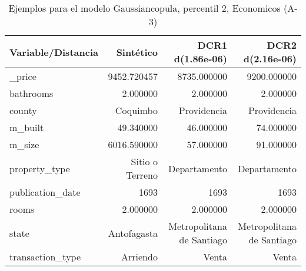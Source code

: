 \begin{table}[H]
\centering
\fontsize{10}{14}\selectfont
\caption{Ejemplos para el modelo Gaussiancopula, percentil 2, Economicos (A-3)}
\label{table-example-economicos-a-3-gaussiancopula-2p}
\begin{tabular}{|l|r|r|r|}
\hline
\rowcolor[gray]{0.8}
Variable/Distancia & Sintético & DCR1 d(1.86e-06) & DCR2 d(2.16e-06) \\
\hline \_price & \cellcolor[rgb]{0.9, 0.54, 0.52} 9452.720457 & 8735.000000 & 9200.000000 \\
\hline bathrooms & \cellcolor[rgb]{0.9, 0.54, 0.52} 2.000000 & \cellcolor[rgb]{0.9, 0.54, 0.52} 2.000000 & \cellcolor[rgb]{0.9, 0.54, 0.52} 2.000000 \\
\hline county & \cellcolor[rgb]{0.9, 0.54, 0.52} Coquimbo & Providencia & Providencia \\
\hline m\_built & \cellcolor[rgb]{0.9, 0.54, 0.52} 49.340000 & 46.000000 & 74.000000 \\
\hline m\_size & \cellcolor[rgb]{0.9, 0.54, 0.52} 6016.590000 & 57.000000 & 91.000000 \\
\hline property\_type & \cellcolor[rgb]{0.9, 0.54, 0.52} Sitio o Terreno & Departamento & Departamento \\
\hline publication\_date & \cellcolor[rgb]{0.9, 0.54, 0.52} 1693 & \cellcolor[rgb]{0.9, 0.54, 0.52} 1693 & \cellcolor[rgb]{0.9, 0.54, 0.52} 1693 \\
\hline rooms & \cellcolor[rgb]{0.9, 0.54, 0.52} 2.000000 & \cellcolor[rgb]{0.9, 0.54, 0.52} 2.000000 & \cellcolor[rgb]{0.9, 0.54, 0.52} 2.000000 \\
\hline state & \cellcolor[rgb]{0.9, 0.54, 0.52} Antofagasta & Metropolitana de Santiago & Metropolitana de Santiago \\
\hline transaction\_type & \cellcolor[rgb]{0.9, 0.54, 0.52} Arriendo & Venta & Venta \\
\hline
\end{tabular}
\end{table}
